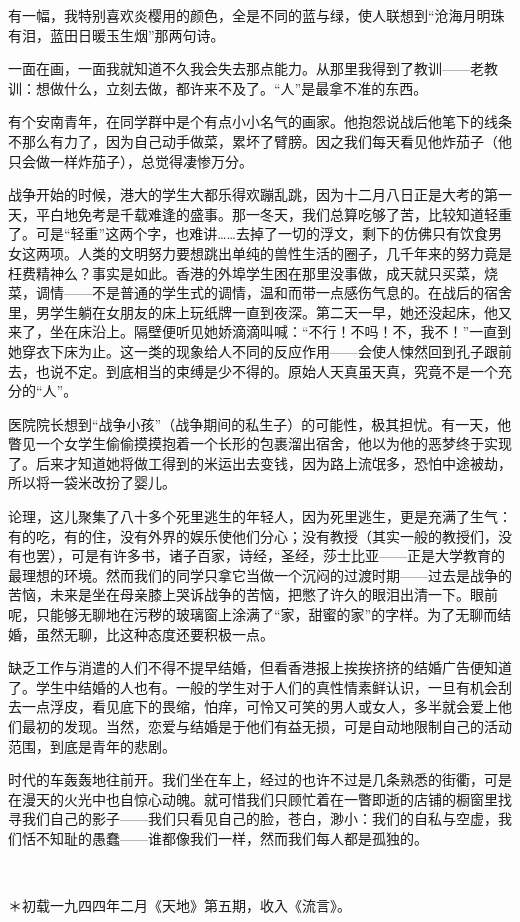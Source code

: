 \par 有一幅，我特别喜欢炎樱用的颜色，全是不同的蓝与绿，使人联想到“沧海月明珠有泪，蓝田日暖玉生烟”那两句诗。
\par 一面在画，一面我就知道不久我会失去那点能力。从那里我得到了教训——老教训：想做什么，立刻去做，都许来不及了。“人”是最拿不准的东西。
\par 有个安南青年，在同学群中是个有点小小名气的画家。他抱怨说战后他笔下的线条不那么有力了，因为自己动手做菜，累坏了臂膀。因之我们每天看见他炸茄子（他只会做一样炸茄子），总觉得凄惨万分。
\par 战争开始的时候，港大的学生大都乐得欢蹦乱跳，因为十二月八日正是大考的第一天，平白地免考是千载难逢的盛事。那一冬天，我们总算吃够了苦，比较知道轻重了。可是“轻重”这两个字，也难讲……去掉了一切的浮文，剩下的仿佛只有饮食男女这两项。人类的文明努力要想跳出单纯的兽性生活的圈子，几千年来的努力竟是枉费精神么？事实是如此。香港的外埠学生困在那里没事做，成天就只买菜，烧菜，调情——不是普通的学生式的调情，温和而带一点感伤气息的。在战后的宿舍里，男学生躺在女朋友的床上玩纸牌一直到夜深。第二天一早，她还没起床，他又来了，坐在床沿上。隔壁便听见她娇滴滴叫喊：“不行！不吗！不，我不！”一直到她穿衣下床为止。这一类的现象给人不同的反应作用——会使人悚然回到孔子跟前去，也说不定。到底相当的束缚是少不得的。原始人天真虽天真，究竟不是一个充分的“人”。
\par 医院院长想到“战争小孩”（战争期间的私生子）的可能性，极其担忧。有一天，他瞥见一个女学生偷偷摸摸抱着一个长形的包裹溜出宿舍，他以为他的恶梦终于实现了。后来才知道她将做工得到的米运出去变钱，因为路上流氓多，恐怕中途被劫，所以将一袋米改扮了婴儿。
\par 论理，这儿聚集了八十多个死里逃生的年轻人，因为死里逃生，更是充满了生气：有的吃，有的住，没有外界的娱乐使他们分心；没有教授（其实一般的教授们，没有也罢），可是有许多书，诸子百家，诗经，圣经，莎士比亚——正是大学教育的最理想的环境。然而我们的同学只拿它当做一个沉闷的过渡时期——过去是战争的苦恼，未来是坐在母亲膝上哭诉战争的苦恼，把憋了许久的眼泪出清一下。眼前呢，只能够无聊地在污秽的玻璃窗上涂满了“家，甜蜜的家”的字样。为了无聊而结婚，虽然无聊，比这种态度还要积极一点。
\par 缺乏工作与消遣的人们不得不提早结婚，但看香港报上挨挨挤挤的结婚广告便知道了。学生中结婚的人也有。一般的学生对于人们的真性情素鲜认识，一旦有机会刮去一点浮皮，看见底下的畏缩，怕痒，可怜又可笑的男人或女人，多半就会爱上他们最初的发现。当然，恋爱与结婚是于他们有益无损，可是自动地限制自己的活动范围，到底是青年的悲剧。
\par 时代的车轰轰地往前开。我们坐在车上，经过的也许不过是几条熟悉的街衢，可是在漫天的火光中也自惊心动魄。就可惜我们只顾忙着在一瞥即逝的店铺的橱窗里找寻我们自己的影子——我们只看见自己的脸，苍白，渺小：我们的自私与空虚，我们恬不知耻的愚蠢——谁都像我们一样，然而我们每人都是孤独的。
\par  
\par ＊初载一九四四年二月《天地》第五期，收入《流言》。


